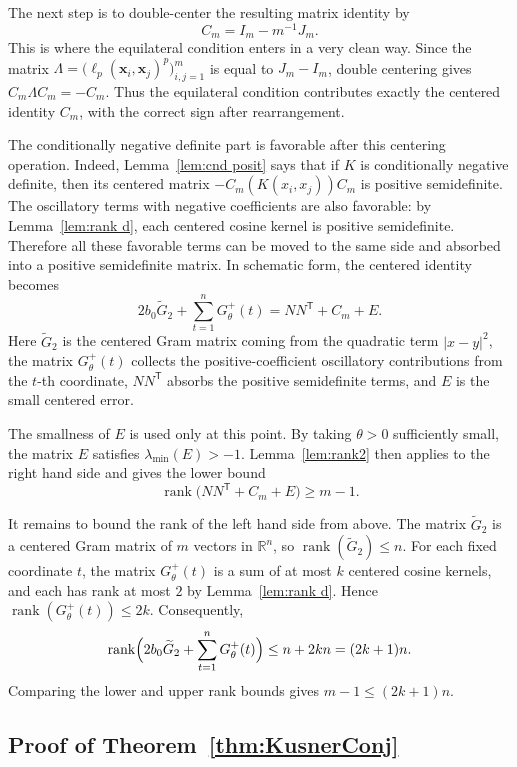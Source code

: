 \documentclass[11pt]{article}
\theoremstyle{definition}
\begin{document}
The next step is to double-center the resulting matrix identity by
\[
C_m=I_m-m^{-1}J_m.
\]
This is where the equilateral condition enters in a very clean way. Since the matrix
\(
\Lambda=\bigl(\ell_p(\boldsymbol{x}_i,\boldsymbol{x}_j)^p\bigr)_{i,j=1}^m
\)
is equal to \(J_m-I_m\), double centering gives
\(
C_m\Lambda C_m=-C_m.
\)
Thus the equilateral condition contributes exactly the centered identity \(C_m\), with the correct sign after rearrangement.

The conditionally negative definite part is favorable after this centering operation. Indeed, Lemma~\ref{lem:cnd posit} says that if \(K\) is conditionally negative definite, then its centered matrix \(-C_m(K(x_i,x_j))C_m\) is positive semidefinite. The oscillatory terms with negative coefficients are also favorable: by Lemma~\ref{lem:rank d}, each centered cosine kernel is positive semidefinite. Therefore all these favorable terms can be moved to the same side and absorbed into a positive semidefinite matrix. In schematic form, the centered identity becomes
\[
2b_0\widetilde G_2+\sum_{t=1}^n G_\theta^+(t)
=
NN^{\mathsf T}+C_m+E.
\]
Here \(\widetilde G_2\) is the centered Gram matrix coming from the quadratic term \(|x-y|^2\), the matrix \(G_\theta^+(t)\) collects the positive-coefficient oscillatory contributions from the \(t\)-th coordinate, \(NN^{\mathsf T}\) absorbs the positive semidefinite terms, and \(E\) is the small centered error.

The smallness of \(E\) is used only at this point. By taking \(\theta>0\) sufficiently small, the matrix \(E\) satisfies
\(
\lambda_{\min}(E)>-1.
\)
Lemma~\ref{lem:rank2} then applies to the right hand side and gives the lower bound
\[
\operatorname{rank}\bigl(NN^{\mathsf T}+C_m+E\bigr)\ge m-1.
\]

It remains to bound the rank of the left hand side from above. The matrix \(\widetilde G_2\) is a centered Gram matrix of \(m\) vectors in \(\mathbb R^n\), so
\(
\operatorname{rank}(\widetilde G_2)\le n.
\)
For each fixed coordinate \(t\), the matrix \(G_\theta^+(t)\) is a sum of at most \(k\) centered cosine kernels, and each has rank at most \(2\) by Lemma~\ref{lem:rank d}. Hence
\(
\operatorname{rank}(G_\theta^+(t))\le 2k.
\)
Consequently,
\[
\operatorname{rank}\Bigl(2b_0\widetilde G_2+\sum_{t=1}^n G_\theta^+(t)\Bigr)
\le n+2kn=(2k+1)n.
\]
Comparing the lower and upper rank bounds gives
\(
m-1\le (2k+1)n.
\)
\subsection{Proof of Theorem~\ref{thm:KusnerConj}}
\end{document}
